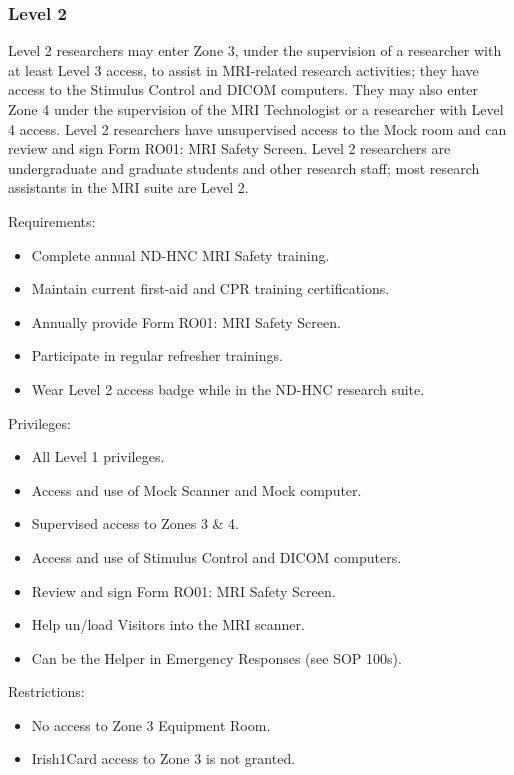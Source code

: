 \documentclass[11pt]{article}
\begin{document}
\subsubsection{Level 2}
\label{sssec:access-levels-2}

Level 2 researchers may enter Zone 3, under the supervision of a researcher with at least Level 3 access, to assist in MRI-related research activities; they have access to the Stimulus Control and DICOM computers. They may also enter Zone 4 under the supervision of the MRI Technologist or a researcher with Level 4 access. Level 2 researchers have unsupervised access to the Mock room and can review and sign Form RO01: MRI Safety Screen. Level 2 researchers are undergraduate and graduate students and other research staff; most research assistants in the MRI suite are Level 2.

Requirements:
\begin{itemize}
	\item Complete annual ND-HNC MRI Safety training.
	\item Maintain current first-aid and CPR training certifications.
	\item Annually provide Form RO01: MRI Safety Screen.
	\item Participate in regular refresher trainings.
	\item Wear Level 2 access badge while in the ND-HNC research suite.
\end{itemize}

Privileges:
\begin{itemize}
	\item All Level 1 privileges.
	\item Access and use of Mock Scanner and Mock computer.
	\item Supervised access to Zones 3 \& 4.
	\item Access and use of Stimulus Control and DICOM computers.
	\item Review and sign Form RO01: MRI Safety Screen.
	\item Help un/load Visitors into the MRI scanner.
	\item Can be the Helper in Emergency Responses (see SOP 100s).
\end{itemize}

Restrictions:
\begin{itemize}
	\item No access to Zone 3 Equipment Room.
	\item Irish1Card access to Zone 3 is not granted.
\end{itemize}
\end{document}
